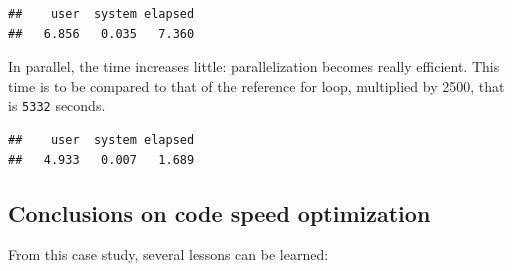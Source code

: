 \documentclass[
  12pt,
  american,
  a4paper,
  extrafontsizes,onecolumn,openright
  ]{memoir}
\newenvironment{Shaded}{\begin{snugshade}}{\end{snugshade}}
\newcommand{\DecValTok}[1]{\textcolor[rgb]{0.00,0.00,0.81}{#1}}
\newcommand{\FunctionTok}[1]{\textcolor[rgb]{0.00,0.00,0.00}{#1}}
\newcommand{\NormalTok}[1]{#1}
\newcommand{\OtherTok}[1]{\textcolor[rgb]{0.56,0.35,0.01}{#1}}
\newcommand{\SpecialCharTok}[1]{\textcolor[rgb]{0.00,0.00,0.00}{#1}}
\begin{document}
\scriptsize

\begin{Shaded}
\end{Shaded}

\begin{verbatim}
##    user  system elapsed 
##   6.856   0.035   7.360
\end{verbatim}

\normalsize

In parallel, the time increases little: parallelization becomes really efficient.
This time is to be compared to that of the reference for loop, multiplied by 2500, that is \texttt{5332} seconds.

\scriptsize

\begin{Shaded}
\end{Shaded}

\begin{verbatim}
##    user  system elapsed 
##   4.933   0.007   1.689
\end{verbatim}

\normalsize

\hypertarget{conclusions-on-code-speed-optimization}{%
\subsection{Conclusions on code speed optimization}\label{conclusions-on-code-speed-optimization}}

From this case study, several lessons can be learned:
\end{document}
